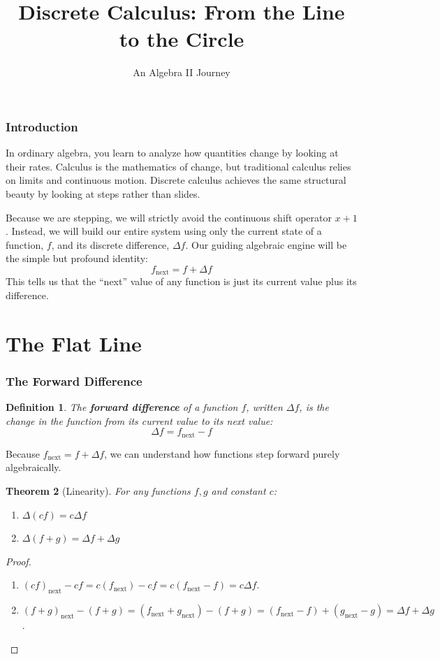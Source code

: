 \documentclass[12pt]{article}
\title{Discrete Calculus: From the Line to the Circle}
\author{An Algebra II Journey}
\date{}
\newtheorem{theorem}{Theorem}
\newtheorem{definition}[theorem]{Definition}
\newcommand{\next}[1]{#1_{\text{next}}}
\begin{document}
\maketitle

\section*{Introduction}
In ordinary algebra, you learn to analyze how quantities change by looking at their rates. Calculus is the mathematics of change, but traditional calculus relies on limits and continuous motion. Discrete calculus achieves the same structural beauty by looking at steps rather than slides. 

Because we are stepping, we will strictly avoid the continuous shift operator $x+1$. Instead, we will build our entire system using only the current state of a function, $f$, and its discrete difference, $\Delta f$. Our guiding algebraic engine will be the simple but profound identity:
\[ \next{f} = f + \Delta f \]
This tells us that the ``next'' value of any function is just its current value plus its difference. 

\part{The Flat Line}

\section{The Forward Difference}

\begin{definition}
The \textbf{forward difference} of a function $f$, written $\Delta f$, is the change in the function from its current value to its next value:
\[ \Delta f = \next{f} - f \]
\end{definition}

Because $\next{f} = f + \Delta f$, we can understand how functions step forward purely algebraically.

\begin{theorem}[Linearity]
For any functions $f, g$ and constant $c$:
\begin{enumerate}
    \item $\Delta(cf) = c\Delta f$
    \item $\Delta(f + g) = \Delta f + \Delta g$
\end{enumerate}
\end{theorem}

\begin{proof}
\begin{enumerate}
    \item $\next{(cf)} - cf = c(\next{f}) - cf = c(\next{f} - f) = c\Delta f$.
    \item $\next{(f+g)} - (f+g) = (\next{f} + \next{g}) - (f+g) = (\next{f} - f) + (\next{g} - g) = \Delta f + \Delta g$. \qedhere
\end{enumerate}
\end{proof}
\end{document}
